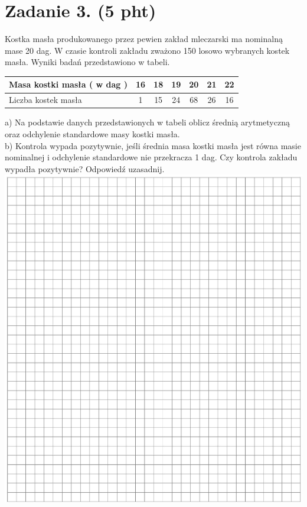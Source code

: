 \documentclass[10pt]{article}
\begin{document}
\section*{Zadanie 3. (5 pht)}
Kostka masła produkowanego przez pewien zakład mleczarski ma nominalną mase 20 dag. W czasie kontroli zakładu zważono 150 losowo wybranych kostek masła. Wyniki badań przedstawiono w tabeli.

\begin{center}
\begin{tabular}{|l|c|c|c|c|c|c|}
\hline
Masa kostki masła ( w dag ) & 16 & 18 & 19 & 20 & 21 & 22 \\
\hline
Liczba kostek masła & 1 & 15 & 24 & 68 & 26 & 16 \\
\hline
\end{tabular}
\end{center}

a) Na podstawie danych przedstawionych w tabeli oblicz średnią arytmetyczną oraz odchylenie standardowe masy kostki masła.\\
b) Kontrola wypada pozytywnie, jeśli średnia masa kostki masła jest równa masie nominalnej i odchylenie standardowe nie przekracza 1 dag. Czy kontrola zakładu wypadła pozytywnie? Odpowiedź uzasadnij.\\
\includegraphics[max width=\textwidth, center]{2024_11_21_99a977d92f90f1d0fb7fg-04}
\end{document}
